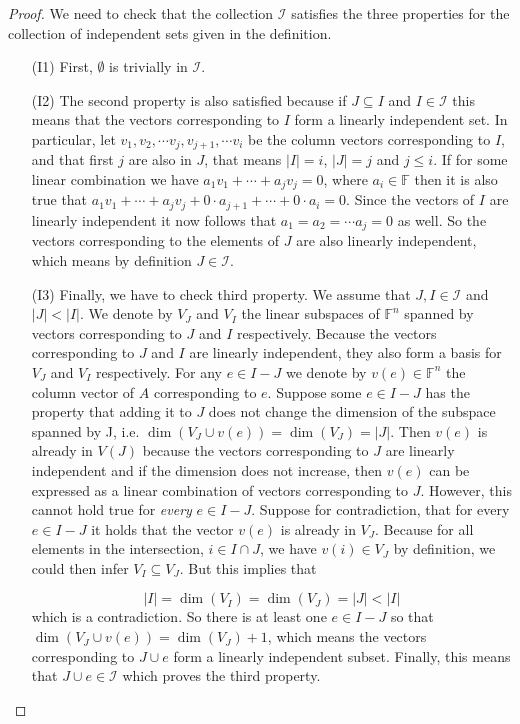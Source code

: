 \begin{proof}
    We need to check that the collection $\mathcal{I}$ satisfies the three properties for the collection of independent sets given in the definition. 

\begin{enumerate}

    \item[(I1)] First, $\emptyset$ is trivially in $\mathcal{I}$.
    
    \item[(I2)] The second property is also satisfied because if $J \subseteq I$ and $I \in \mathcal{I}$ this means that the vectors corresponding to $I$ form a linearly independent set. In particular, let $v_1, v_2, \cdots v_j, v_{j+1}, \cdots v_{i}$ be the column vectors corresponding to $I$, and that first $j$ are also in $J$, that means $|I| = i$, $|J| = j$ and $j \leq i$. If for some linear combination we have $a_1v_1 + \cdots + a_jv_j = 0$, where $a_i \in \mathbb{F}$ then it is also true that $a_1v_1 + \cdots + a_jv_j + 0 \cdot a_{j+1} + \cdots + 0 \cdot a_i = 0$. Since the vectors of $I$ are linearly independent it now follows that $a_1 = a_2 = \cdots a_j = 0$ as well. So the vectors corresponding to the elements of $J$ are also linearly independent, which means by definition $J \in \mathcal{I}$.

    \item[(I3)] Finally, we have to check third property. We assume that $J, I \in \mathcal{I}$ and $|J| < |I|$. We denote by $V_J$ and $V_I$ the linear subspaces of $\mathbb{F}^n$ spanned by vectors corresponding to $J$ and $I$ respectively. Because the vectors corresponding to $J$ and $I$ are linearly independent, they also form a basis for $V_J$ and $V_I$ respectively. For any $e \in I - J$ we denote by $v(e) \in \mathbb{F}^n$ the column vector of $A$ corresponding to $e$. Suppose some $e \in I - J$ has the property that adding it to $J$ does not change the dimension of the subspace spanned by J, i.e. $\dim (V_J \cup v(e)) = \dim (V_J) = |J|$. Then $v(e)$ is already in $V(J)$ because the vectors corresponding to $J$ are linearly independent and if the dimension does not increase, then $v(e)$ can be expressed as a linear combination of vectors corresponding to $J$. However, this cannot hold true for \textit{every} $e \in I - J$. Suppose for contradiction, that for every $e \in I - J$ it holds that the vector $v(e) $ is already in $ V_J$. Because for all elements in the intersection,  $i \in I \cap J$, we have $v(i) \in V_J$ by definition, we could then infer $V_I \subseteq V_J$. But this implies that 

    $$|I| = \dim(V_I) = \dim(V_J) = |J| < |I|$$
     which is a contradiction. So there is at least one $e \in I - J$ so that $\dim(V_J \cup v(e)) = \dim(V_J) + 1$, which means the vectors corresponding to $J \cup e$ form a linearly independent subset. Finally, this means that $J \cup e \in \mathcal{I}$ which proves the third property.

\end{enumerate}
\end{proof}

